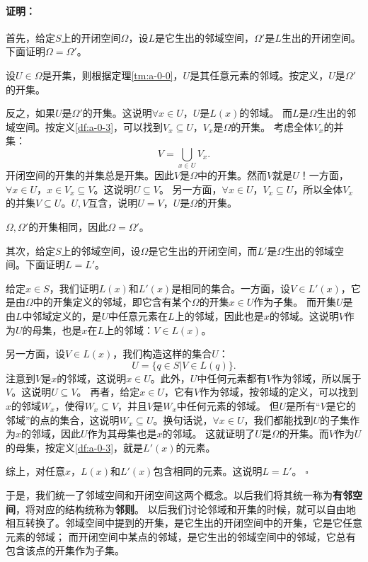 \documentclass[12pt,UTF8]{ctexbook}
\theoremstyle{definition}
\theoremstyle{plain}
\renewenvironment{proof}{\paragraph{\textbf{证明：}}}{\hfill$\square$}
\begin{document}
\begin{appendix}
\begin{proof}
    首先，给定$S$上的开闭空间$\Omega$，设$L$是它生出的邻域空间，$\Omega'$是$L$生出的开闭空间。下面证明$\Omega = \Omega'$。
    
    设$U\in\Omega$是开集，则根据定理\ref{tm:a-0-0}，$U$是其任意元素的邻域。按定义，$U$是$\Omega'$的开集。

    反之，如果$U$是$\Omega'$的开集。这说明$\forall x \in U$，$U$是$L(x)$的邻域。
    而$L$是$\Omega$生出的邻域空间。按定义\ref{df:a-0-3}，可以找到$V_x\subseteq U$，$V_x$是$\Omega$的开集。
    考虑全体$V_x$的并集：
    $$V = \bigcup_{x\in U} V_x. $$
    开闭空间的开集的并集总是开集。因此$V$是$\Omega$中的开集。然而$V$就是$U$！一方面，$\forall x\in U$，$x\in V_x \subseteq V$。这说明$U\subseteq V$。
    另一方面，$\forall x\in U$，$V_x\subseteq U$，所以全体$V_x$的并集$V\subseteq U$。$U, V$互含，说明$U = V$，$U$是$\Omega$的开集。

    $\Omega,\Omega'$的开集相同，因此$\Omega = \Omega'$。

    其次，给定$S$上的邻域空间，设$\Omega$是它生出的开闭空间，而$L'$是$\Omega$生出的邻域空间。下面证明$L=L'$。

    给定$x\in S$，我们证明$L(x)$和$L'(x)$是相同的集合。一方面，设$V\in L'(x)$，它是由$\Omega$中的开集定义的邻域，即它含有某个$\Omega$的开集$x\in U$作为子集。
    而开集$U$是由$L$中邻域定义的，是$U$中任意元素在$L$上的邻域，因此也是$x$的邻域。这说明$V$作为$U$的母集，也是$x$在$L$上的邻域：$V\in L(x)$。

    另一方面，设$V\in L(x)$，我们构造这样的集合$U$：
    $$ U = \{q \in S | V \in L(q)\}. $$
    注意到$V$是$x$的邻域，这说明$x\in U$。此外，$U$中任何元素都有$V$作为邻域，所以属于$V$。这说明$U\subseteq V$。
    再者，给定$x\in U$，它有$V$作为邻域，按邻域的定义，可以找到$x$的邻域$W_x$，使得$W_x \subseteq V$，并且$V$是$W_x$中任何元素的邻域。
    但$U$是所有“$V$是它的邻域”的点的集合，这说明$W_x\subseteq U$。换句话说，$\forall x\in U$，我们都能找到$U$的子集作为$x$的邻域，因此$U$作为其母集也是$x$的邻域。
    这就证明了$U$是$\Omega$的开集。而$V$作为$U$的母集，按定义\ref{df:a-0-3}，就是$L'(x)$的元素。

    综上，对任意$x$，$L(x)$和$L'(x)$包含相同的元素。这说明$L=L'$。    
\end{proof}

于是，我们统一了邻域空间和开闭空间这两个概念。以后我们将其统一称为\textbf{有邻空间}，将对应的结构统称为\textbf{邻则}。
以后我们讨论邻域和开集的时候，就可以自由地相互转换了。邻域空间中提到的开集，是它生出的开闭空间中的开集，它是它任意元素的邻域；
而开闭空间中某点的邻域，是它生出的邻域空间中的邻域，它总有包含该点的开集作为子集。


\end{appendix}
\end{document}
